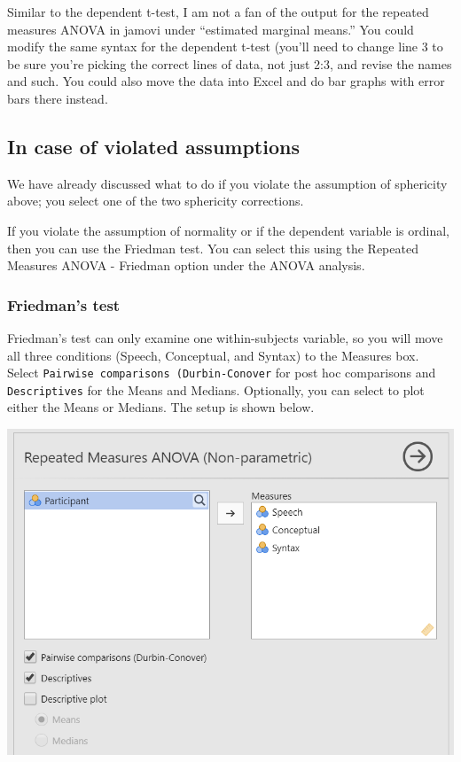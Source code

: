 \documentclass[
]{book}
\begin{document}
Similar to the dependent t-test, I am not a fan of the output for the repeated measures ANOVA in jamovi under ``estimated marginal means.'' You could modify the same syntax for the dependent t-test (you'll need to change line 3 to be sure you're picking the correct lines of data, not just 2:3, and revise the names and such. You could also move the data into Excel and do bar graphs with error bars there instead.

\hypertarget{in-case-of-violated-assumptions-6}{%
\subsection{In case of violated assumptions}\label{in-case-of-violated-assumptions-6}}

We have already discussed what to do if you violate the assumption of sphericity above; you select one of the two sphericity corrections.

If you violate the assumption of normality or if the dependent variable is ordinal, then you can use the Friedman test. You can select this using the Repeated Measures ANOVA - Friedman option under the ANOVA analysis.

\hypertarget{friedmans-test}{%
\subsubsection{Friedman's test}\label{friedmans-test}}

Friedman's test can only examine one within-subjects variable, so you will move all three conditions (Speech, Conceptual, and Syntax) to the Measures box. Select \texttt{Pairwise\ comparisons\ (Durbin-Conover} for post hoc comparisons and \texttt{Descriptives} for the Means and Medians. Optionally, you can select to plot either the Means or Medians. The setup is shown below.

\includegraphics{images/05-repeated-measures-anova/rm-anova_friedman_setup.png}
\end{document}
